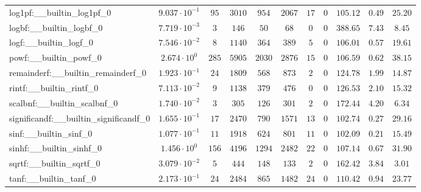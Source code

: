 \begin{tabular}{|l|c|c|c|c|c|c|c|c|c|c|}
log1pf:\_\_builtin\_log1pf\_0             & $ 9.037 \cdot 10^{-1} $ & $ 95     $ & $ 3010  $ & $ 954   $ & $ 2067  $ & $ 17  $ & $ 0 $ & $ 105.12      $ & $ 0.49    $ & $ 25.20   $ \\
logbf:\_\_builtin\_logbf\_0               & $ 7.719 \cdot 10^{-3} $ & $ 3      $ & $ 146   $ & $ 50    $ & $ 68    $ & $ 0   $ & $ 0 $ & $ 388.65      $ & $ 7.43    $ & $ 8.45    $ \\
logf:\_\_builtin\_logf\_0                 & $ 7.546 \cdot 10^{-2} $ & $ 8      $ & $ 1140  $ & $ 364   $ & $ 389   $ & $ 5   $ & $ 0 $ & $ 106.01      $ & $ 0.57    $ & $ 19.61   $ \\
powf:\_\_builtin\_powf\_0                 & $ 2.674 \cdot 10^{0}  $ & $ 285    $ & $ 5905  $ & $ 2030  $ & $ 2876  $ & $ 15  $ & $ 0 $ & $ 106.59      $ & $ 0.62    $ & $ 38.15   $ \\
remainderf:\_\_builtin\_remainderf\_0     & $ 1.923 \cdot 10^{-1} $ & $ 24     $ & $ 1809  $ & $ 568   $ & $ 873   $ & $ 2   $ & $ 0 $ & $ 124.78      $ & $ 1.99    $ & $ 14.87   $ \\
rintf:\_\_builtin\_rintf\_0               & $ 7.113 \cdot 10^{-2} $ & $ 9      $ & $ 1138  $ & $ 379   $ & $ 476   $ & $ 0   $ & $ 0 $ & $ 126.53      $ & $ 2.10    $ & $ 15.32   $ \\
scalbnf:\_\_builtin\_scalbnf\_0           & $ 1.740 \cdot 10^{-2} $ & $ 3      $ & $ 305   $ & $ 126   $ & $ 301   $ & $ 2   $ & $ 0 $ & $ 172.44      $ & $ 4.20    $ & $ 6.34    $ \\
significandf:\_\_builtin\_significandf\_0 & $ 1.655 \cdot 10^{-1} $ & $ 17     $ & $ 2470  $ & $ 790   $ & $ 1571  $ & $ 13  $ & $ 0 $ & $ 102.74      $ & $ 0.27    $ & $ 29.16   $ \\
sinf:\_\_builtin\_sinf\_0                 & $ 1.077 \cdot 10^{-1} $ & $ 11     $ & $ 1918  $ & $ 624   $ & $ 801   $ & $ 11  $ & $ 0 $ & $ 102.09      $ & $ 0.21    $ & $ 15.49   $ \\
sinhf:\_\_builtin\_sinhf\_0               & $ 1.456 \cdot 10^{0}  $ & $ 156    $ & $ 4196  $ & $ 1294  $ & $ 2482  $ & $ 22  $ & $ 0 $ & $ 107.14      $ & $ 0.67    $ & $ 31.90   $ \\
sqrtf:\_\_builtin\_sqrtf\_0               & $ 3.079 \cdot 10^{-2} $ & $ 5      $ & $ 444   $ & $ 148   $ & $ 133   $ & $ 2   $ & $ 0 $ & $ 162.42      $ & $ 3.84    $ & $ 3.01    $ \\
tanf:\_\_builtin\_tanf\_0                 & $ 2.173 \cdot 10^{-1} $ & $ 24     $ & $ 2484  $ & $ 865   $ & $ 1482  $ & $ 24  $ & $ 0 $ & $ 110.42      $ & $ 0.94    $ & $ 23.77   $ \\

\end{tabular}
